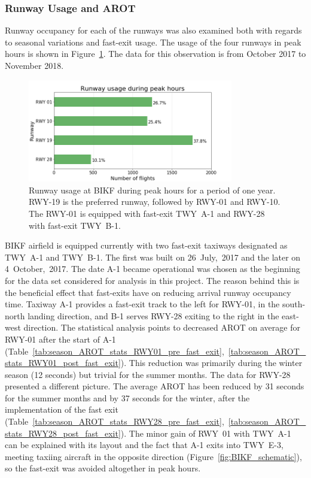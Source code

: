 \subsubsection{Runway Usage and AROT\label{sssec:runway_usage_arot}}
Runway occupancy for each of the runways was also examined both with regards to seasonal variations and fast-exit usage. The usage of the four runways in peak hours is shown in Figure~\ref{fig:runway_usage_peak}. The data for this observation is from October 2017 to November 2018.
\begin{figure}[h]
    \centering
    \includegraphics[width=0.8\textwidth]{graphics/fig_runway_usage_peak.png}
    \caption[Runway usage at BIKF during peak hours]{Runway usage at BIKF during peak hours for a period of one year. RWY-19 is the preferred runway, followed by RWY-01 and RWY-10. The RWY-01 is equipped with fast-exit TWY~A-1 and RWY-28 with fast-exit TWY~B-1.}
    \label{fig:runway_usage_peak}
\end{figure}
BIKF airfield is equipped currently with two fast-exit taxiways designated as TWY~A-1 and TWY~B-1. The first was built on 26~July,~2017 and the later on 4~October,~2017. The date A-1 became operational was chosen as the beginning for the data set considered for analysis in this project. The reason behind this is the beneficial effect that fast-exits have on reducing arrival runway occupancy time. Taxiway A-1 provides a fast-exit track to the left for RWY-01, in the south-north landing direction, and B-1 serves RWY-28 exiting to the right in the east-west direction. The statistical analysis points to decreased AROT on average for RWY-01 after the start of A-1 (Table~\ref{tab:season_AROT_stats_RWY01_pre_fast_exit},~\ref{tab:season_AROT_stats_RWY01_post_fast_exit}). This reduction was primarily during the winter season (12 seconds) but trivial for the summer months. The data for RWY-28 presented a different picture. The average AROT has been reduced by 31 seconds for the summer months and by 37 seconds for the winter, after the implementation of the fast exit (Table~\ref{tab:season_AROT_stats_RWY28_pre_fast_exit},~\ref{tab:season_AROT_stats_RWY28_post_fast_exit}). The minor gain of RWY~01 with TWY~A-1 can be explained with its layout and the fact that A-1 exits into TWY~E-3, meeting taxiing aircraft in the opposite direction (Figure~\ref{fig:BIKF_schematic}), so the fast-exit was avoided altogether in peak hours.\\
